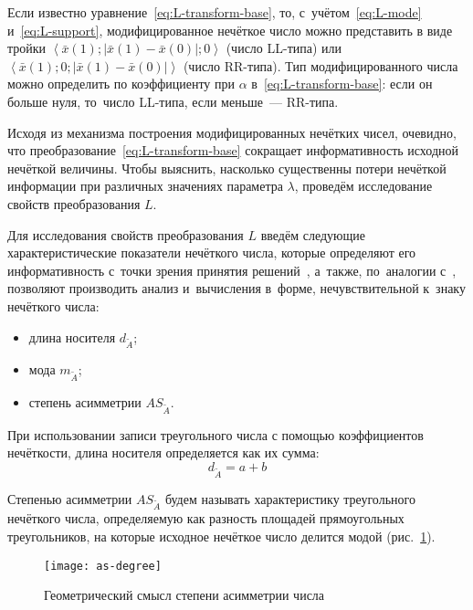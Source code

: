 Если известно уравнение~\eqref{eq:L-transform-base}, то, с~учётом~\eqref{eq:L-mode} и~\eqref{eq:L-support}, модифицированное нечёткое число можно представить в виде тройки $\displaystyle \left\langle \bar{x}\left( 1 \right);\left| \bar{x}\left( 1 \right)-\bar{x}\left( 0 \right) \right|;0 \right\rangle$ (число LL-типа) или $\displaystyle \left\langle \bar{x}\left( 1 \right);0;\left| \bar{x}\left( 1 \right)-\bar{x}\left( 0 \right) \right| \right\rangle$ (число RR-типа). Тип модифицированного числа можно определить по коэффициенту при $\alpha$ в~\eqref{eq:L-transform-base}: если он больше нуля, то~число LL-типа, если меньше~--- RR-типа.

Исходя из механизма построения модифицированных нечётких чисел, очевидно, что преобразование~\eqref{eq:L-transform-base} сокращает информативность исходной нечёткой величины. Чтобы выяснить, насколько существенны потери нечёткой информации при различных значениях параметра $\lambda$, проведём исследование свойств преобразования $L$.

Для исследования свойств преобразования $L$ введём следующие характеристические показатели нечёткого числа, которые определяют его информативность с~точки зрения принятия решений~\cite{Vorontsov_PI, Alushta-1}, а~также, по~аналогии с~\cite{Spesivtsev}, позволяют производить анализ и~вычисления в~форме, нечувствительной к~знаку нечёткого числа:
\begin{itemize}
  \item длина носителя $d_{\tilde A}$;
  \item мода $m_{\tilde A}$;
  \item степень асимметрии $AS_{\tilde A}$.
\end{itemize}

При использовании записи треугольного числа с помощью коэффициентов нечёткости, длина носителя определяется как их сумма:
\begin{equation}
\label{eq:support-length}
  d_{\tilde A}=a+b
\end{equation}

\begin{mydef}
  Степенью асимметрии $AS_{\tilde A}$ будем называть характеристику треугольного нечёткого числа, определяемую как разность площадей прямоугольных треугольников, на которые исходное нечёткое число делится модой (рис.~\ref{fig:as-degree}).
\end{mydef}
\begin{figure}[h!]
  \centering
  {
    \texttt{[image: as-degree]}
    \caption{Геометрический смысл степени асимметрии числа}
    \label{fig:as-degree}
  }
\end{figure}

